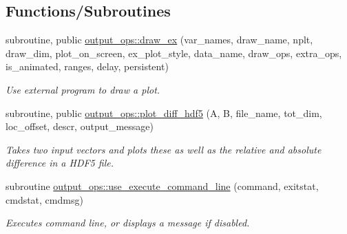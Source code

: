 \subsection*{Functions/\+Subroutines}
\begin{DoxyCompactItemize}
\item 
subroutine, public \hyperlink{namespaceoutput__ops_a50bfbb88cc91805469353c3ff47b3e2e}{output\+\_\+ops\+::draw\+\_\+ex} (var\+\_\+names, draw\+\_\+name, nplt, draw\+\_\+dim, plot\+\_\+on\+\_\+screen, ex\+\_\+plot\+\_\+style, data\+\_\+name, draw\+\_\+ops, extra\+\_\+ops, is\+\_\+animated, ranges, delay, persistent)
\begin{DoxyCompactList}\small\item\em Use external program to draw a plot. \end{DoxyCompactList}\item 
subroutine, public \hyperlink{namespaceoutput__ops_ab0d14194d01ab0534562eab50b37a57a}{output\+\_\+ops\+::plot\+\_\+diff\+\_\+hdf5} (A, B, file\+\_\+name, tot\+\_\+dim, loc\+\_\+offset, descr, output\+\_\+message)
\begin{DoxyCompactList}\small\item\em Takes two input vectors and plots these as well as the relative and absolute difference in a H\+D\+F5 file. \end{DoxyCompactList}\item 
subroutine \hyperlink{namespaceoutput__ops_aa9e4855511b6ea16a08b3efb587bec51}{output\+\_\+ops\+::use\+\_\+execute\+\_\+command\+\_\+line} (command, exitstat, cmdstat, cmdmsg)
\begin{DoxyCompactList}\small\item\em Executes command line, or displays a message if disabled. \end{DoxyCompactList}\end{DoxyCompactItemize}
